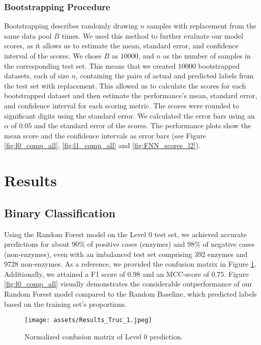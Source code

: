 \documentclass{bioinfo}
\begin{document}
\begin{methods}
\subsubsection{Bootstrapping Procedure}
Bootstrapping describes randomly drawing $n$ samples with replacement from the same data pool $B$ times.
We used this method to further evaluate our model scores, as it allows us to estimate the mean, standard error, and confidence interval of the scores.
We chose $B$ as $10000$, and $n$ as the number of samples in the corresponding test set.
This means that we created $10000$ bootstrapped datasets, each of size $n$, containing the pairs of actual and predicted labels from the test set with replacement.
This allowed us to calculate the scores for each bootstrapped dataset and then estimate the performance's mean, 
standard error, and confidence interval for each scoring metric.
The scores were rounded to significant digits using the standard error.
We calculated the error bars using an $\alpha$ of $0.05$ and the standard error of the scores.
The performance plots show the mean score and the confidence intervals as error bars (see Figure \ref{fig:l0_comp_all}, \ref{fig:l1_comp_all} and \ref{fig:FNN_scores_l2}).

\end{methods}

\clearpage
\section{Results}	

\subsection{Binary Classification}\label{sec:RF_level0}
Using the Random Forest model on the Level $0$ test set, we achieved accurate
predictions for about $90\%$ of positive cases (enzymes) and $98\%$ of negative
cases (non-enzymes), even with an imbalanced test set comprising $392$
enzymes and $9728$ non-enzymes. As a reference, we provided the confusion
matrix in Figure \ref{fig:RF_conf_l0}.
Additionally, we attained a F1 score of $0.98$ and an MCC-score of $0.75$. 
Figure \ref{fig:l0_comp_all} visually demonstrates the considerable outperformance of our Random Forest model 
compared to the Random Baseline, which predicted labels based on the training set's proportions.

\begin{figure}[!hb]
\texttt{[image: assets/Results\_Truc\_1.jpeg]}
\caption{Normalized confusion matrix of Level 0 prediction.}\label{fig:RF_conf_l0}
\end{figure}
\end{document}
